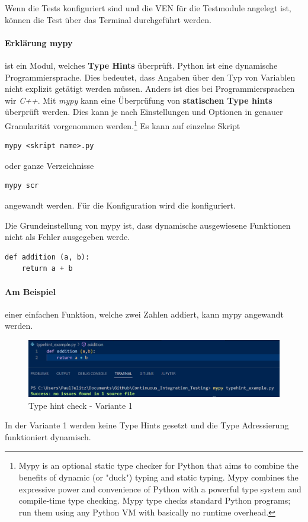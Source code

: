 Wenn die Tests konfiguriert sind und die \gls{VEN} für die Testmodule angelegt ist, können die Test über das Terminal durchgeführt werden.

\paragraph{Erklärung mypy} ist ein Modul, welches \textbf{Type Hints} überprüft.
Python ist eine dynamische Programmiersprache. Dies bedeutet, dass Angaben über den Typ von Variablen nicht explizit getätigt werden müssen. Anders ist dies bei Programmiersprachen wir \textit{C++}. Mit \textit{mypy} kann eine Überprüfung von \textbf{statischen Type hints} überprüft werden. Dies kann je nach Einstellungen und Optionen in genauer Granularität vorgenommen werden.\footnote{
Mypy is an optional static type checker for Python that aims to combine the benefits of dynamic (or "duck") typing and static typing. Mypy combines the expressive power and convenience of Python with a powerful type system and compile-time type checking. Mypy type checks standard Python programs; run them using any Python VM with basically no runtime overhead.
} 
Es kann auf einzelne Skript

\begin{lstlisting}[style=CMD]
mypy <skript name>.py
\end{lstlisting}

oder ganze Verzeichnisse
\begin{lstlisting}[style=CMD]
	mypy scr
\end{lstlisting}
angewandt werden. Für die Konfiguration wird die  konfiguriert.

Die Grundeinstellung von mypy ist, dass dynamische ausgewiesene Funktionen nicht als Fehler ausgegeben werde.

\begin{lstlisting}[style=python, caption={Example dynamical typed function}, captionpos=b]
def addition (a, b):
	return a + b
\end{lstlisting} 

\paragraph{Am Beispiel} einer einfachen Funktion, welche zwei Zahlen addiert, kann mypy angewandt werden.
\begin{figure}[H]
	\centering
	\includegraphics[scale = 0.6]{attachment/chapter_2/Scc078}
	\caption{Type hint check - Variante 1}
\end{figure}
In der Variante 1 werden keine Type Hints gesetzt und die Type Adressierung funktioniert dynamisch.


